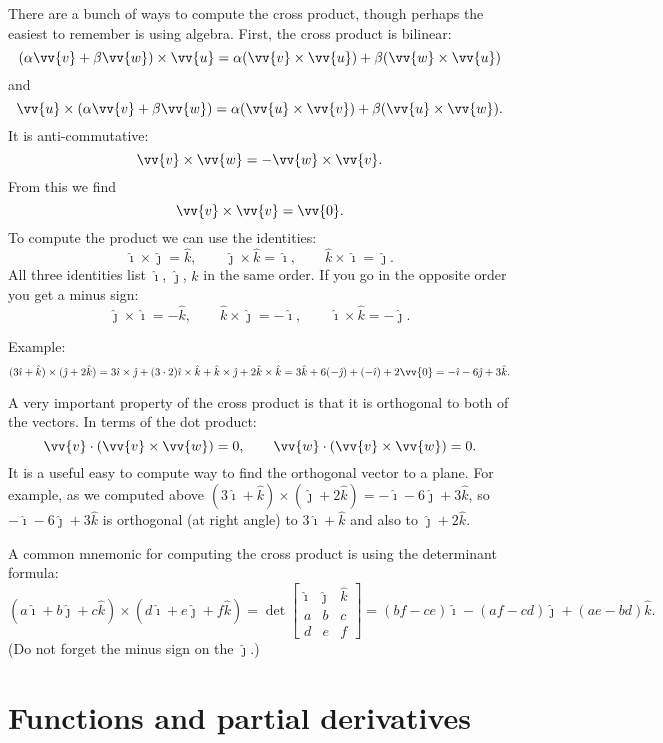 \documentclass[11pt]{article}
\newcommand{\veci}{\hat{\imath}}
\newcommand{\vecj}{\hat{\jmath}}
\newcommand{\veck}{\hat{k}}
\begin{document}
There are a bunch of ways to compute the cross product, though perhaps the easiest to remember
is using algebra.
First, the cross product is bilinear:
$$
( \alpha \vv{v} + \beta \vv{w} ) \times \vv{u}
=
\alpha (\vv{v} \times \vv{u}) + \beta (\vv{w} \times \vv{u})
$$
and
$$
\vv{u} \times
( \alpha \vv{v} + \beta \vv{w} )
=
\alpha (\vv{u} \times \vv{v}) + \beta (\vv{u} \times \vv{w}) .
$$
It is anti-commutative:
$$
\vv{v} \times \vv{w} = - \vv{w} \times \vv{v} .
$$
From this we find
$$
\vv{v} \times \vv{v} = \vv{0} .
$$
To compute the product we can use the identities:
$$
\veci \times \vecj = \veck , \qquad
\vecj \times \veck = \veci , \qquad
\veck \times \veci = \vecj .
$$
All three identities list $\veci$, $\vecj$, $\veck$ in the same order.
If you go in the opposite order you get a minus sign:
$$
\vecj \times \veci = -\veck , \qquad
\veck \times \vecj = -\veci , \qquad
\veci \times \veck = -\vecj .
$$

Example:
$$
(3 \veci + \veck) \times (\vecj + 2 \veck)
=
3 \veci \times \vecj + (3 \cdot 2) \veci \times \veck
+
\veck \times \vecj + 2 \veck \times \veck
=
3 \veck + 6 ( - \vecj)
+
(-\veci) + 2 \vv{0}
=
-\veci - 6\vecj + 3 \veck .
$$

A very important property of the cross product is that it is orthogonal
to both of the vectors.
In terms of the dot product:
$$
\vv{v} \cdot (\vv{v} \times \vv{w}) = 0 , \qquad
\vv{w} \cdot (\vv{v} \times \vv{w}) = 0 .
$$
It is a useful easy to compute way to find the orthogonal vector to a plane.
For example, as we computed above
$(3 \veci + \veck) \times (\vecj + 2 \veck)
=
-\veci - 6\vecj + 3 \veck$, so
$-\veci - 6\vecj + 3 \veck$ is orthogonal
(at right angle) to 
$3 \veci + \veck$ and also to
$\vecj + 2 \veck$.

A common mnemonic for computing the cross product
is using the determinant formula:
$$
(a \veci + b \vecj + c \veck ) \times 
(d \veci + e \vecj + f \veck ) =
\det
\begin{bmatrix}
\veci & \vecj & \veck \\
a & b & c \\
d & e & f
\end{bmatrix}
=
(bf-ce) \veci -
(af-cd) \vecj +
(ae-bd) \veck .
$$
(Do not forget the minus sign on the $\vecj$.)


\section{Functions and partial derivatives}
\end{document}
